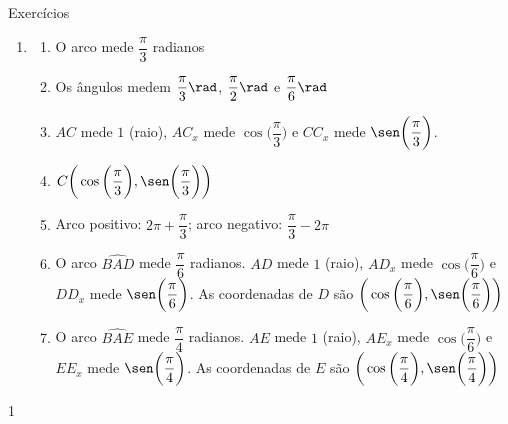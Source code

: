 \begin{answer}{Exercícios}
{\exerciselist\small
\begin{enumerate}
\item 
\begin{enumerate}
\item O arco mede $\dfrac{\pi}{3}$ radianos 

\item Os ângulos medem $\dfrac{\pi}{3}\rad$, $\dfrac{\pi}{2}\rad$ e $\dfrac{\pi}{6}\rad$

\item $AC$ mede $1$ (raio), $AC_x$ mede $\cos\bigg(\dfrac{\pi}{3}\bigg)$ e $CC_x$ mede $\sen\bigg(\dfrac{\pi}{3}\bigg)$.

\item $C\bigg(\cos\bigg(\dfrac{\pi}{3}\bigg),\sen\bigg(\dfrac{\pi}{3}\bigg)\bigg)$

\item Arco positivo: $2\pi+\dfrac{\pi}{3}$; arco negativo: $\dfrac{\pi}{3}-2\pi$

\item O arco $\widehat{BAD}$ mede $\dfrac{\pi}{6}$ radianos. $AD$ mede $1$ (raio), $AD_x$ mede $\cos\bigg(\dfrac{\pi}{6}\bigg)$ e $DD_x$ mede $\sen\bigg(\dfrac{\pi}{6}\bigg)$. As coordenadas de $D$ são $\bigg(\cos\bigg(\dfrac{\pi}{6}\bigg), \sen\bigg(\dfrac{\pi}{6}\bigg)\bigg)$

\item O arco $\widehat{BAE}$ mede $\dfrac{\pi}{4}$ radianos. $AE$ mede $1$ (raio), $AE_x$ mede $\cos\bigg(\dfrac{\pi}{6}\bigg)$ e $EE_x$ mede
$\sen\bigg(\dfrac{\pi}{4}\bigg)$. As coordenadas de $E$ são $\bigg(\cos\bigg(\dfrac{\pi}{4}\bigg), \sen\bigg(\dfrac{\pi}{4}\bigg)\bigg)$
\end{enumerate}
\end{enumerate}
}{1}
\end{answer}

